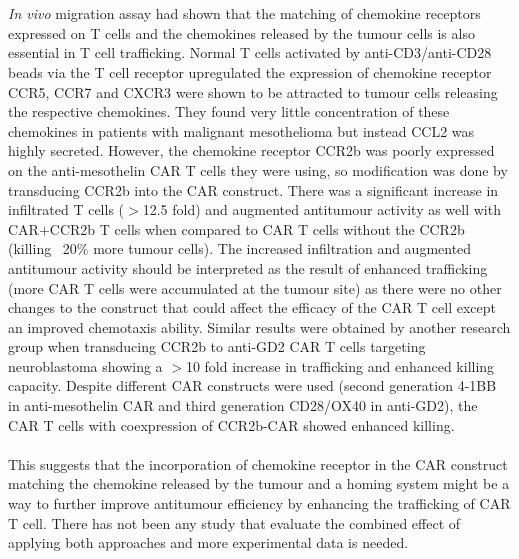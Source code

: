 \documentclass[12pt,oneside]{report}
\begin{document}
\\\\\textit{In vivo} migration assay had shown that the matching of chemokine receptors expressed on T cells and the chemokines released by the tumour cells is also essential in T cell trafficking\citep{CCR2-2, CCR, CCR-2}. Normal T cells activated by anti-CD3/anti-CD28 beads via the T cell receptor upregulated the expression of chemokine receptor CCR5, CCR7 and CXCR3 were shown to be attracted to tumour cells releasing the respective chemokines\citep{CCR2}. They found very little concentration of these chemokines in patients with malignant mesothelioma but instead CCL2 was highly secreted\citep{CCR2}. However, the chemokine receptor CCR2b was poorly expressed on the anti-mesothelin CAR T cells they were using, so modification was done by transducing CCR2b into the CAR construct\citep{CCR2}. There was a significant increase in infiltrated T cells\citep{CCR2} ($>$12.5 fold) and augmented antitumour activity as well with CAR$+$CCR2b T cells when compared to CAR T cells without the CCR2b\citep{CCR2} (killing ~20$\%$ more tumour cells). The increased infiltration and augmented antitumour activity should be interpreted as the result of enhanced trafficking (more CAR T cells were accumulated at the tumour site) as there were no other changes to the construct that could affect the efficacy of the CAR T cell except an improved chemotaxis ability. Similar results were obtained by another research group when transducing CCR2b to anti-GD2 CAR T cells targeting neuroblastoma\citep{CCR2-2} showing a $>$10 fold increase in trafficking and enhanced killing capacity. Despite different CAR constructs were used (second generation 4-1BB in anti-mesothelin CAR and third generation CD28/OX40 in anti-GD2), the CAR T cells with coexpression of CCR2b-CAR showed enhanced killing. 
\\\\This suggests that the incorporation of chemokine receptor in the CAR construct matching the chemokine released by the tumour and a homing system might be a way to further improve antitumour efficiency by enhancing the trafficking of CAR T cell. There has not been any study that evaluate the combined effect of applying both approaches and more experimental data is needed.
\end{document}
